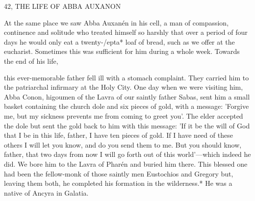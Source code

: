 42, THE LIFE OF ABBA AUXANON

At the same place we saw Abba Auxanén in his cell, a man of
compassion, continence and solitude who treated himself so harshly
that over a period of four days he would only eat a twenty-/epta*
loaf of bread, such as we offer at the eucharist. Sometimes this was
sufficient for him during a whole week. Towards the end of his life,

this ever-memorable father fell ill with a stomach complaint. They
carried him to the patriarchal infirmary at the Holy City. One day
when we were visiting him, Abba Conon, higoumen of the Lavra of
our saintly father Sabas, sent him a small basket containing the
church dole and six pieces of gold, with a message: 'Forgive me, but
my sickness prevents me from coming to greet you'. The elder
accepted the dole but sent the gold back to him with this message:
'If it be the will of God that I be in this life, father, I have ten
pieces of gold. If I have need of these others I will let you know,
and do you send them to me. But you should know, father, that
two days from now I will go forth out of this world'—which indeed
he did. We bore him to the Lavra of Pharén and buried him there.
This blessed one had been the fellow-monk of those saintly men
Eustochios and Gregory but, leaving them both, he completed his
formation in the wilderness.* He was a native of Ancyra in Galatia.

